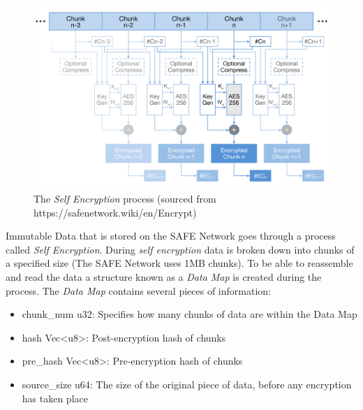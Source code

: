 \begin{figure}[h]
	\begin{center}
		\includegraphics[width=\textwidth]{diagrams/self-encryption}
		\caption{The \textit{Self Encryption} process (sourced from https://safenetwork.wiki/en/Encrypt)}
		\label{fig:self-encryption}
	\end{center}
\end{figure}

Immutable Data that is stored on the SAFE Network goes through a process called \textit{Self Encryption}\cite{irvine2010self}. During \textit{self encryption} data is broken down into chunks of a specified size (The SAFE Network uses 1MB chunks). To be able to reassemble and read the data a structure known as a \textit{Data Map} is created during the process. The \textit{Data Map} contains several pieces of information:

\begin{itemize}
	\item chunk\_num u32: Specifies how many chunks of data are within the Data Map
	\item hash Vec\textless u8\textgreater: Post-encryption hash of chunks
	\item pre\_hash Vec\textless u8\textgreater: Pre-encryption hash of chunks
	\item source\_size u64: The size of the original piece of data, before any encryption has taken place
\end{itemize}

